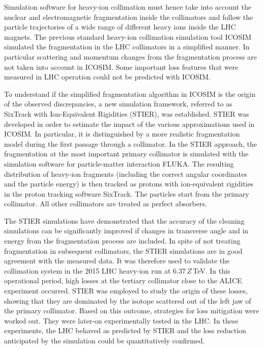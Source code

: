 \newpage
Simulation software for heavy-ion collimation must hence take into account the nuclear and electromagnetic fragmentation inside the collimators and follow the particle trajectories of a wide range of different heavy ions inside the LHC magnets. The previous standard heavy-ion collimation simulation tool ICOSIM simulated the fragmentation in the LHC collimators in a simplified manner. In particular scattering and momentum changes from the fragmentation process are not taken into account in ICOSIM. Some important loss features that were measured in LHC operation could not be predicted with ICOSIM. 



\thispagestyle{plain}

To understand if the simplified fragmentation algorithm in ICOSIM is the origin of the observed discrepancies, a new simulation framework, referred to as SixTrack with Ion-Equivalent Rigidities (STIER), was established. STIER was developed in order to estimate the impact of the various approximations used in ICOSIM. In particular, it is distinguished by a more realistic fragmentation model during the first passage through a collimator. In the STIER approach, the fragmentation at the most important primary collimator is simulated with the simulation software for particle-matter interaction FLUKA. The resulting distribution of heavy-ion fragments (including the correct angular coordinates and the particle energy) is then tracked as protons with ion-equivalent rigidities in the proton tracking software SixTrack. The particles start from the primary collimator. All other collimators are treated as perfect absorbers.
\vspace{0.2cm}

The STIER simulations have demonstrated that the accuracy of the cleaning simulations can be significantly improved if changes in transverse angle and in energy from the fragmentation process are included. In spite of not treating fragmentation in subsequent collimators, the STIER simulations are in good agreement with the measured data. It was therefore used to validate the collimation system in the 2015 LHC heavy-ion run at 6.37$\,Z\,$TeV. In this operational period, high losses at the tertiary collimator close to the \mbox{ALICE} experiment occurred. STIER was employed to study the origin of these losses, showing that they are dominated by the isotope  scattered out of the left jaw of the primary collimator. Based on this outcome, strategies for loss mitigation were worked out. They were later-on experimentally tested in the LHC. In these experiments, the LHC behaved as predicted by STIER and the loss reduction anticipated by the simulation could be quantitatively confirmed.
\vspace{0.2cm}

